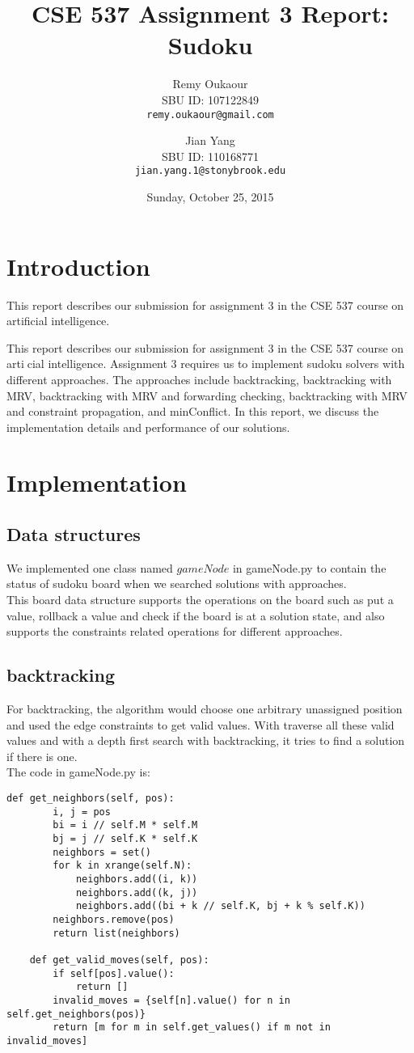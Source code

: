 \documentclass[11pt]{article}
\title{CSE 537 Assignment 3 Report: Sudoku}
\author{
Remy Oukaour \\
	{\small SBU ID: 107122849}\\
	{\small \texttt{remy.oukaour@gmail.com}}
\and
Jian Yang \\
	{\small SBU ID: 110168771}\\
	{\small \texttt{jian.yang.1@stonybrook.edu}}
}
\date{Sunday, October 25, 2015}
\begin{document}
\maketitle

\section{Introduction}

This report describes our submission for assignment 3 in the CSE 537 course on
artificial intelligence.

This report describes our submission for assignment 3 in the CSE 537 course on articial intelligence.
Assignment 3 requires us to implement sudoku solvers with different approaches.
The approaches include backtracking, backtracking with MRV, backtracking with MRV and forwarding checking, backtracking with MRV and constraint propagation, and minConflict.
In this report, we discuss the implementation details and performance of our solutions.

\section{Implementation}

\subsection{Data structures}
We implemented one class named $gameNode$ in gameNode.py to contain the status of sudoku board when we searched solutions with approaches. \\
This board data structure supports the operations on the board such as put a value, rollback a value and check if the board is at a solution state, and also supports the constraints related operations for different approaches.

\subsection{backtracking}

For backtracking, the algorithm would choose one arbitrary unassigned position and used the edge constraints to get valid values. With traverse all these valid values and with a depth first search with backtracking, it tries to find a solution if there is one. \\
The code in gameNode.py is:

\lstset{language=Python}
\begin{lstlisting}[frame=single]
	def get_neighbors(self, pos):
		i, j = pos
		bi = i // self.M * self.M
		bj = j // self.K * self.K
		neighbors = set()
		for k in xrange(self.N):
			neighbors.add((i, k))
			neighbors.add((k, j))
			neighbors.add((bi + k // self.K, bj + k % self.K))
		neighbors.remove(pos)
		return list(neighbors)

	def get_valid_moves(self, pos):
		if self[pos].value():
			return []
		invalid_moves = {self[n].value() for n in self.get_neighbors(pos)}
		return [m for m in self.get_values() if m not in invalid_moves]
\end{lstlisting}
\end{document}
